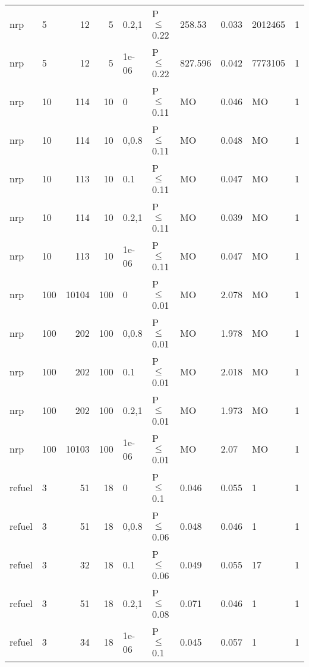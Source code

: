 \begin{longtable}{llrrllllll}
 nrp           & 5        &     	12 &   5 & 0.2,1 & P$\leq$0.22  & 258.53  & 0.033   & 2012465 & 1    \\
 nrp           & 5        &     	12 &   5 & 1e-06 & P$\leq$0.22  & 827.596 & 0.042   & 7773105 & 1    \\
 nrp           & 10       &    	114 &  10 & 0     & P$\leq$0.11  & MO      & 0.046   & MO      & 1    \\
 nrp           & 10       &    	114 &  10 & 0,0.8 & P$\leq$0.11  & MO      & 0.048   & MO      & 1    \\
 nrp           & 10       &    	113 &  10 & 0.1   & P$\leq$0.11  & MO      & 0.047   & MO      & 1    \\
 nrp           & 10       &    	114 &  10 & 0.2,1 & P$\leq$0.11  & MO      & 0.039   & MO      & 1    \\
 nrp           & 10       &    	113 &  10 & 1e-06 & P$\leq$0.11  & MO      & 0.047   & MO      & 1    \\
 nrp           & 100      &  	10104 & 100 & 0     & P$\leq$0.01  & MO      & 2.078   & MO      & 1    \\
 nrp           & 100      &    	202 & 100 & 0,0.8 & P$\leq$0.01  & MO      & 1.978   & MO      & 1    \\
 nrp           & 100      &    	202 & 100 & 0.1   & P$\leq$0.01  & MO      & 2.018   & MO      & 1    \\
 nrp           & 100      &    	202 & 100 & 0.2,1 & P$\leq$0.01  & MO      & 1.973   & MO      & 1    \\
 nrp           & 100      &  	10103 & 100 & 1e-06 & P$\leq$0.01  & MO      & 2.07    & MO      & 1    \\
 refuel        & 3        &     	51 &  18 & 0     & P$\leq$0.1   & 0.046   & 0.055   & 1       & 1    \\
 refuel        & 3        &     	51 &  18 & 0,0.8 & P$\leq$0.06  & 0.048   & 0.046   & 1       & 1    \\
 refuel        & 3        &     	32 &  18 & 0.1   & P$\leq$0.06  & 0.049   & 0.055   & 17      & 1    \\
 refuel        & 3        &     	51 &  18 & 0.2,1 & P$\leq$0.08  & 0.071   & 0.046   & 1       & 1    \\
 refuel        & 3        &     	34 &  18 & 1e-06 & P$\leq$0.1   & 0.045   & 0.057   & 1       & 1    \\
\bottomrule
\end{longtable}
